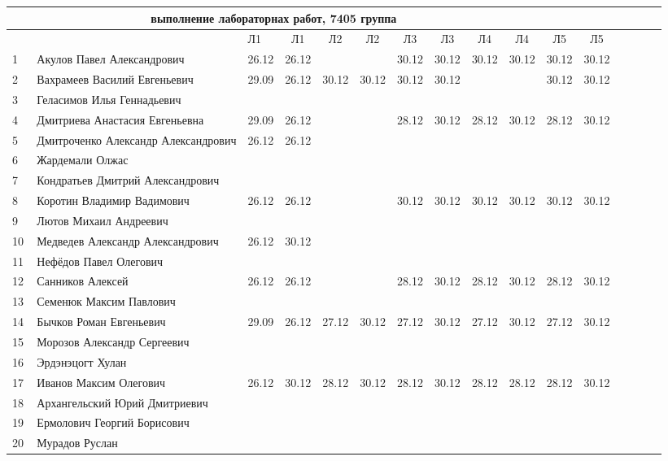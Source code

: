 \documentclass[a4paper,landscape,11pt]{article}
\begin{document}
\newpage
%
\hspace{-4.1cm} %
\begin{tabular}{l|llccccccccccccc}
\multicolumn{10}{c}{выполнение лабораторнах работ, 7405 группа} \\
\toprule
&&Л1&Л1& Л2&Л2& Л3&Л3& Л4&Л4&Л5&Л5\\
\midrule
1\,& Акулов Павел Александрович            &26.12& 26.12&      &      & 30.12& 30.12& 30.12& 30.12& 30.12& 30.12\\
2\,& Вахрамеев Василий Евгеньевич          &29.09& 26.12& 30.12& 30.12& 30.12& 30.12&      &      & 30.12& 30.12\\
3\,& Геласимов Илья Геннадьевич            &&&&&&&&\\
4\,& Дмитриева Анастасия Евгеньевна        &29.09& 26.12&      &      & 28.12& 30.12& 28.12& 30.12& 28.12& 30.12\\
5\,& Дмитроченко Александр Александрович   &26.12& 26.12&      &      &&&&\\
\midrule
6\,& Жардемали Олжас   &&&&&&&&\\
7\,& Кондратьев Дмитрий Александрович      &&&&&&&&\\
8\,& Коротин Владимир Вадимович            &26.12& 26.12&      &      & 30.12& 30.12& 30.12& 30.12& 30.12& 30.12\\
9\,& Лютов Михаил Андреевич                &&&&&&&&\\
10\,&Медведев Александр Александрович      &26.12& 30.12&&&&&&\\
\midrule
11\,&Нефёдов Павел Олегович                &&&&&&&&\\
12\,&Санников Алексей                      &26.12& 26.12&      &      & 28.12& 30.12& 28.12& 30.12& 28.12& 30.12\\
13\,&Семенюк Максим Павлович               &&&&&&&&\\
14\,&Бычков Роман Евгеньевич               &29.09& 26.12& 27.12& 30.12& 27.12& 30.12& 27.12& 30.12& 27.12& 30.12\\
15\,&Морозов Александр Сергеевич           &&&&&&&&\\
\midrule
16\,&Эрдэнэцогт Хулан                      &&&&&&&&\\
17\,&Иванов Максим Олегович                &26.12& 30.12& 28.12& 30.12& 28.12& 30.12& 28.12& 28.12& 28.12& 30.12\\
18\,&Архангельский Юрий Дмитриевич         &&&&&&&&\\ 
19\,&Ермолович Георгий Борисович           &&&&&&&&\\
20\,& Мурадов Руслан                       &&&&&&&&\\
\bottomrule
\end{tabular}
\end{document}

